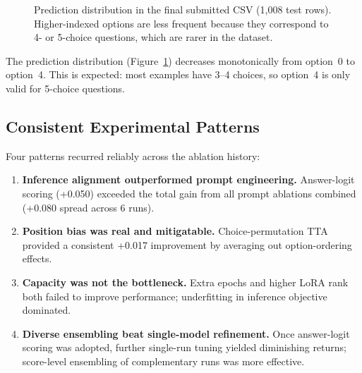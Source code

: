 \documentclass[11pt,twocolumn]{article}
\begin{document}
\begin{figure}[t]
\centering
{}
\caption{Prediction distribution in the final submitted CSV (1,008 test rows). Higher-indexed options are less frequent because they correspond to 4- or 5-choice questions, which are rarer in the dataset.}
\label{fig:dist}
\end{figure}

The prediction distribution (Figure~\ref{fig:dist}) decreases monotonically from option~0 to option~4. This is expected: most examples have 3--4 choices, so option~4 is only valid for 5-choice questions.

\subsection{Consistent Experimental Patterns}

Four patterns recurred reliably across the ablation history:
\begin{enumerate}[leftmargin=*, noitemsep, topsep=3pt]
  \item \textbf{Inference alignment outperformed prompt engineering.} Answer-logit scoring (+0.050) exceeded the total gain from all prompt ablations combined (+0.080 spread across 6 runs).
  \item \textbf{Position bias was real and mitigatable.} Choice-permutation TTA provided a consistent +0.017 improvement by averaging out option-ordering effects.
  \item \textbf{Capacity was not the bottleneck.} Extra epochs and higher LoRA rank both failed to improve performance; underfitting in inference objective dominated.
  \item \textbf{Diverse ensembling beat single-model refinement.} Once answer-logit scoring was adopted, further single-run tuning yielded diminishing returns; score-level ensembling of complementary runs was more effective.
\end{enumerate}
\end{document}
